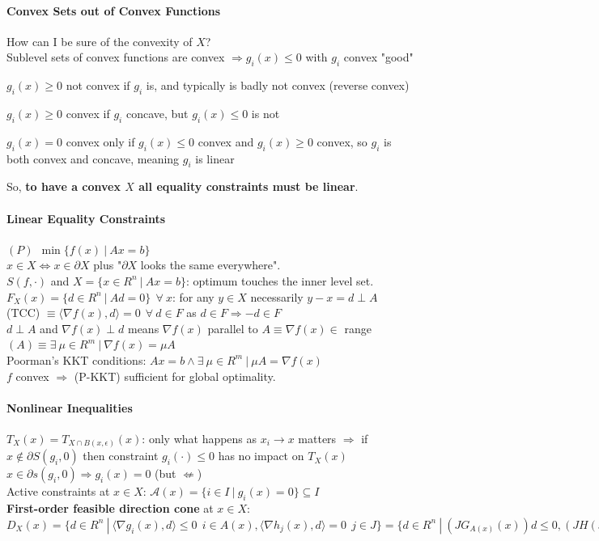\documentclass[10pt]{report}
\begin{document}
\paragraph{Convex Sets out of Convex Functions} How can I be sure of the convexity of $X$?\\
Sublevel sets of convex functions are convex $\Rightarrow g_i(x)\leq 0$ with $g_i$ convex "good"\begin{list}{}{}
	\item $g_i(x) \geq 0$ not convex if $g_i$ is, and typically is badly not convex (reverse convex)
	\item $g_i(x) \geq 0$ convex if $g_i$ concave, but $g_i(x) \leq 0$ is not
	\item $g_i(x) = 0$ convex only if $g_i(x)\leq 0$ convex and $g_i(x) \geq 0$ convex, so $g_i$ is both convex and concave, meaning $g_i$ is linear
\end{list}
So, \textbf{to have a convex $X$ all equality constraints must be linear}.
\paragraph{Linear Equality Constraints} $(P)\:\:\min\{f(x)\:|\:Ax=b\}$\\
$x\in X \Leftrightarrow x\in \partial X$ plus "$\partial X$ looks the same everywhere".\\
$S(f,\cdot)$ and $X=\{x\in R^n\:|\:Ax=b\}$: optimum touches the inner level set.\\
$F_X(x) = \{d\in R^n\:|\:Ad=0\}\:\:\forall\:x$: for any $y\in X$ necessarily $y-x = d\perp A$\\
(TCC) $\equiv \langle\nabla f(x),d\rangle = 0\:\:\forall\:d\in F$ as $d\in F\Rightarrow -d\in F$\\
$d\perp A$ and $\nabla f(x)\perp d$ means $\nabla f(x)$ parallel to $A\equiv\nabla f(x)\in $ range$(A)\equiv\exists\:\mu\in R^m\:|\:\nabla f(x) = \mu A$\\
Poorman's KKT conditions: $Ax = b \wedge \exists\:\mu\in R^m\:|\:\mu A = \nabla f(x)$\\
$f$ convex $\Rightarrow$ (P-KKT) sufficient for global optimality.
\paragraph{Nonlinear Inequalities} $T_X(x) = T_{X\cap B(x,\epsilon)}(x)$: only what happens as $x_i\rightarrow x$ matters $\Rightarrow$ if $x\not\in \partial S(g_i,0)$ then constraint $g_i(\cdot)\leq 0$ has no impact on $T_X(x)$\\
$x\in\partial s(g_i,0)\Rightarrow g_i(x)=0$ (but $\not\Leftarrow$)\\
Active constraints at $x\in X$: $\mathscr{A}(x) = \{i\in I\:|\:g_i(x)=0\}\subseteq I$\\
\textbf{First-order feasible direction cone} at $x\in X$: $D_X(x) = \{d\in R^n\:|\:\langle\nabla g_i(x), d\rangle\leq 0\:\:i\in A(x),\langle\nabla h_j(x),d\rangle = 0\:\:j\in J\}=\{d\in R^n\:|\:(JG_{A(x)}(x))d\leq 0, (JH(x))d=0\}$
\end{document}
